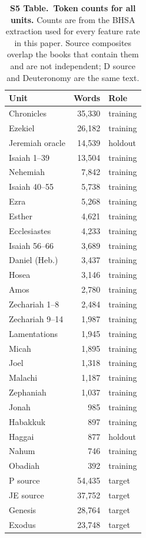 \begin{table}[!ht]
\centering
\caption{\textbf{S5 Table.\ Token counts for all units.}
Counts are from the BHSA extraction used for every feature rate in this paper.
Source composites overlap the books that contain them and are not independent;
D source and Deuteronomy are the same text.}
\begin{tabular}{lrl}
\hline
\textbf{Unit} & \textbf{Words} & \textbf{Role} \\
\hline
Chronicles & 35{,}330 & training \\
Ezekiel & 26{,}182 & training \\
Jeremiah oracle & 14{,}539 & holdout \\
Isaiah 1--39 & 13{,}504 & training \\
Nehemiah & 7{,}842 & training \\
Isaiah 40--55 & 5{,}738 & training \\
Ezra & 5{,}268 & training \\
Esther & 4{,}621 & training \\
Ecclesiastes & 4{,}233 & training \\
Isaiah 56--66 & 3{,}689 & training \\
Daniel (Heb.) & 3{,}437 & training \\
Hosea & 3{,}146 & training \\
Amos & 2{,}780 & training \\
Zechariah 1--8 & 2{,}484 & training \\
Zechariah 9--14 & 1{,}987 & training \\
Lamentations & 1{,}945 & training \\
Micah & 1{,}895 & training \\
Joel & 1{,}318 & training \\
Malachi & 1{,}187 & training \\
Zephaniah & 1{,}037 & training \\
Jonah & 985 & training \\
Habakkuk & 897 & training \\
Haggai & 877 & holdout \\
Nahum & 746 & training \\
Obadiah & 392 & training \\
\hline
P source & 54{,}435 & target \\
JE source & 37{,}752 & target \\
Genesis & 28{,}764 & target \\
Exodus & 23{,}748 & target \\

\end{tabular}
\end{table}
